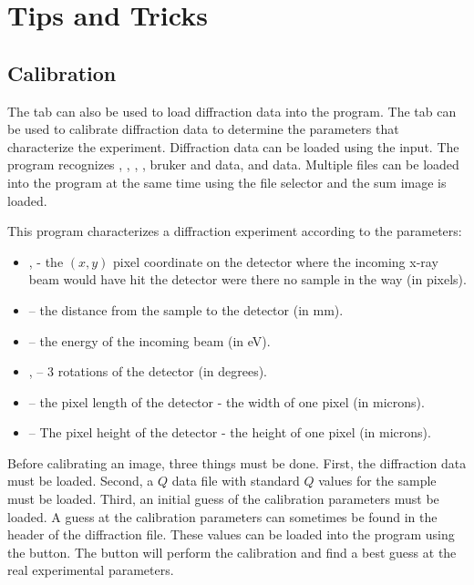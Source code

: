 \chapter{Tips and Tricks}

\section{Calibration}

The  tab can also be used to load
diffraction data into the program. The tab can
be used to calibrate diffraction data to determine the 
parameters that characterize the experiment. 
Diffraction data can be loaded using the  input. 
The program recognizes , , 
, , bruker 
and  data, and  data. 
Multiple files can be loaded into the program at the same
time using the file selector and the sum image is loaded.

This program characterizes a diffraction experiment 
according to the parameters:
\index{$\alpha$}
\index{$\beta$}
\begin{itemize}
    \item {},  - the $(x,y)$ pixel coordinate 
    on the detector where the incoming 
    x-ray beam would have hit the detector were there 
    no sample in the way (in pixels).
    \item {} -- the distance from the sample to 
    the detector (in mm).
    \item {} -- the energy of the incoming beam (in eV).
    \item {},   -- 3 rotations of 
    the detector (in degrees).
    \item {} -- the pixel length of the detector - 
    the width of one pixel (in microns).
    \item {} -- The pixel height of the detector -
    the height of one pixel (in microns).
\end{itemize}
Before calibrating an image, three things must be done. 
First, the diffraction data must be loaded.
Second, a $Q$ data file with standard $Q$ values for the
sample must be loaded.
Third, an initial guess of the calibration parameters must be
loaded. A guess at the calibration parameters can sometimes
be found in the header of the diffraction file. These values
can be loaded into the program using the  
button.  The  button will perform the calibration 
and find a best guess at the real experimental parameters.

